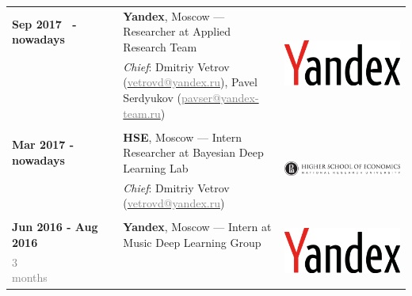 \documentclass[a4paper,10pt]{article} %
\begin{document}
\begin{tabular}{l|p{11.5cm}c}
\textbf{Sep 2017~ - nowadays} & 
\textbf{Yandex}, Moscow --- Researcher at Applied Research Team&
\multirow{2}{*}{	\vspace*{+5cm}\includegraphics[scale=0.014]{img/yandex}} \\
~~~~~~~~~~~&  
\footnotesize{  \vspace{-0.25cm}
	\scriptsize{
		\emph{Chief}: 
		Dmitriy Vetrov
		(\href{mailto:vetrovd@yandex.ru}{\textcolor{gray}{vetrovd@yandex.ru}}),
	Pavel Serdyukov
	(\href{mailto:pavser@yandex-team.ru}{\textcolor{gray}{pavser@yandex-team.ru}})}
	\vspace{-0.1cm}} & 
\\
\multicolumn{2}{c}{}\\

\textbf{Mar 2017 - nowadays} & 
\textbf{HSE}, Moscow --- Intern Researcher at Bayesian Deep Learning Lab &
\multirow{2}{*}{	\vspace*{+5cm}\includegraphics[scale=0.03]{img/hse}} \\
~~~~~~~~~~~&  
\footnotesize{  \vspace{-0.25cm}
\scriptsize{
	\emph{Chief}: 
	Dmitriy Vetrov
	(\href{mailto:vetrovd@yandex.ru}{\textcolor{gray}{vetrovd@yandex.ru}})}
	\vspace{-0.1cm}} & 
\\
\multicolumn{2}{c}{}\\


\textbf{Jun 2016 - Aug 2016} & 
\textbf{Yandex}, Moscow --- Intern at Music Deep Learning Group &
\multirow{2}{*}{\includegraphics[scale=0.014]{img/yandex}} \\ 
\textcolor{gray}{3 months}~~~~~~~~~~~&  \footnotesize{
  
}
\end{tabular}
\end{document}
